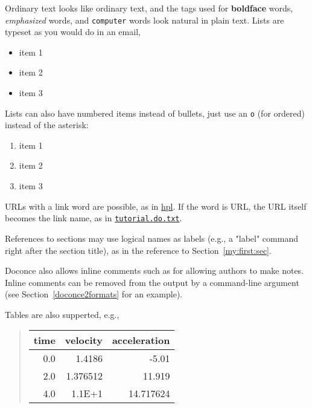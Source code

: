 \documentclass[%
oneside,                 %
final,                   %
10pt]{article}
\newcommand{\shortinlinecomment}[3]{}
\begin{document}
Ordinary text looks like ordinary text, and the tags used for
\textbf{boldface} words, \emph{emphasized} words, and {\fontsize{10pt}{10pt}\Verb!computer!} words look
natural in plain text.  Lists are typeset as you would do in an email,

\begin{itemize}
  \item item 1

  \item item 2

  \item item 3
\end{itemize}

\noindent
Lists can also have numbered items instead of bullets, just use an {\fontsize{10pt}{10pt}\Verb!o!}
(for ordered) instead of the asterisk:

\begin{enumerate}
 \item item 1

 \item item 2

 \item item 3
\end{enumerate}

\noindent
URLs with a link word are possible, as in \href{{http://folk.uio.no/hpl}}{hpl}.
If the word is URL, the URL itself becomes the link name,
as in \href{{tutorial.do.txt}}{\nolinkurl{tutorial.do.txt}}.

References to sections may use logical names as labels (e.g., a
"label" command right after the section title), as in the reference to
Section~\ref{my:first:sec}.

Doconce also allows inline comments such as \shortinlinecomment{hpl 1}{ here I will make
some remarks to the text }{ here I will make } for allowing authors to make notes. Inline
comments can be removed from the output by a command-line argument
(see Section~\ref{doconce2formats} for an example).

Tables are also supperted, e.g.,


\begin{quote}\begin{tabular}{rrr}
\hline
\multicolumn{1}{c}{ time } & \multicolumn{1}{c}{ velocity } & \multicolumn{1}{c}{ acceleration } \\
\hline
0.0          & 1.4186       & -5.01        \\
2.0          & 1.376512     & 11.919       \\
4.0          & 1.1E+1       & 14.717624    \\
\hline
\end{tabular}\end{quote}
\end{document}
